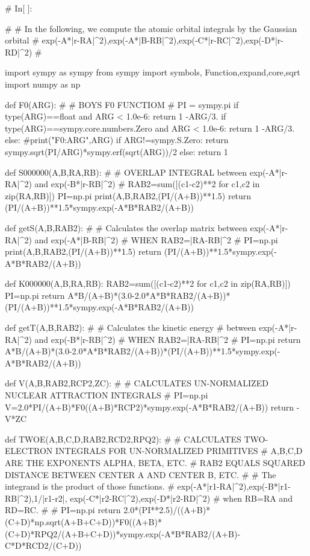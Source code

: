 # In[ ]:


#
# In the following, we compute the atomic orbital integrals by the Gaussian orbital 
#  exp(-A*|r-RA|^2),exp(-A*|B-RB|^2),exp(-C*|r-RC|^2),exp(-D*|r-RD|^2)
#

import sympy as sympy
from sympy import symbols, Function,expand,core,sqrt
import numpy as np


def F0(ARG):
#
# BOYS F0 FUNCTIOM
#
    PI = sympy.pi
    if  type(ARG)==float and ARG < 1.0e-6:
        return 1 -ARG/3.
    if  type(ARG)==sympy.core.numbers.Zero and ARG < 1.0e-6:
        return 1 -ARG/3.
    else:
        #print("F0:ARG",ARG)
        if ARG!=sympy.S.Zero:
            return sympy.sqrt(PI/ARG)*sympy.erf(sqrt(ARG))/2
        else:
            return 1
    
def S000000(A,B,RA,RB):
#
#   OVERLAP INTEGRAL between exp(-A*|r-RA|^2) and exp(-B*|r-RB|^2)
#
    RAB2=sum([(c1-c2)**2 for c1,c2 in zip(RA,RB)])
    PI=np.pi
    print(A,B,RAB2,(PI/(A+B))**1.5)
    return (PI/(A+B))**1.5*sympy.exp(-A*B*RAB2/(A+B))

def getS(A,B,RAB2):
#
# Calculates the overlap matrix between exp(-A*|r-RA|^2) and exp(-A*|B-RB|^2)
# WHEN RAB2=|RA-RB|^2
#
    PI=np.pi
    print(A,B,RAB2,(PI/(A+B))**1.5)
    return (PI/(A+B))**1.5*sympy.exp(-A*B*RAB2/(A+B))

def K000000(A,B,RA,RB):
    RAB2=sum([(c1-c2)**2 for c1,c2 in zip(RA,RB)])
    PI=np.pi
    return A*B/(A+B)*(3.0-2.0*A*B*RAB2/(A+B))*(PI/(A+B))**1.5*sympy.exp(-A*B*RAB2/(A+B))   

def getT(A,B,RAB2):
#
# Calculates the kinetic energy
#  between exp(-A*|r-RA|^2) and exp(-B*|r-RB|^2)
# WHEN RAB2=|RA-RB|^2
#
    PI=np.pi
    return A*B/(A+B)*(3.0-2.0*A*B*RAB2/(A+B))*(PI/(A+B))**1.5*sympy.exp(-A*B*RAB2/(A+B))

def V(A,B,RAB2,RCP2,ZC):
#
#  CALCULATES UN-NORMALIZED NUCLEAR ATTRACTION INTEGRALS
#
    PI=np.pi
    V=2.0*PI/(A+B)*F0((A+B)*RCP2)*sympy.exp(-A*B*RAB2/(A+B))
    return -V*ZC

def TWOE(A,B,C,D,RAB2,RCD2,RPQ2):
#
# CALCULATES TWO-ELECTRON INTEGRALS FOR UN-NORMALIZED PRIMITIVES
# A,B,C,D ARE THE EXPONENTS ALPHA, BETA, ETC.
# RAB2 EQUALS SQUARED DISTANCE BETWEEN CENTER A AND CENTER B, ETC.
#
# The integrand is the product of those functions.
#   exp(-A*|r1-RA|^2),exp(-B*|r1-RB|^2),1/|r1-r2|, exp(-C*|r2-RC|^2),exp(-D*|r2-RD|^2)
# when RB=RA and RD=RC.
#
#
    PI=np.pi
    return 2.0*(PI**2.5)/((A+B)*(C+D)*np.sqrt(A+B+C+D))*F0((A+B)*(C+D)*RPQ2/(A+B+C+D))*sympy.exp(-A*B*RAB2/(A+B)-C*D*RCD2/(C+D))


